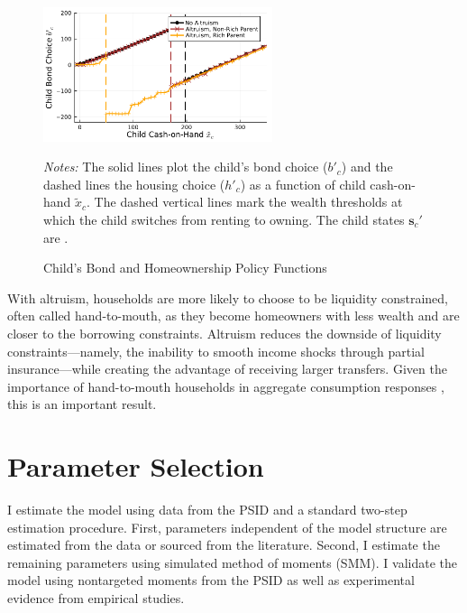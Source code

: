 \documentclass[12pt]{article}
\begin{document}
\begin{figure}
	\begin{center} 
	\caption{Child's Bond and Homeownership Policy Functions}\label{fig:pol}
	\includegraphics[width=0.6\textwidth]{../tabfig/model/pol_bond.pdf}
	\end{center}
	{\vspace{-0.2in}\begin{footnotesize}\textit{Notes:} The solid lines plot the child’s bond choice ($b'_c$) and the dashed lines the housing choice ($h'_c$) as a function of child cash-on-hand $\tilde x_c$. The dashed vertical lines mark the wealth thresholds at which the child switches from renting to owning. The child states $\mathbf{s}_c'$ are \unskip. \end{footnotesize}}
\end{figure}

With altruism, households are more likely to choose to be liquidity constrained, often called hand-to-mouth, as they become homeowners with less wealth and are closer to the borrowing constraints. Altruism reduces the downside of liquidity constraints---namely, the inability to smooth income shocks through partial insurance---while creating the advantage of receiving larger transfers. Given the importance of hand-to-mouth households in aggregate consumption responses \citep[see, e.g.,][]{Kaplan2014a,Boar2020}, this is an important result.

\section{Parameter Selection}\label{sec:estimation}
I estimate the model using data from the PSID and a standard two-step estimation procedure. First, parameters independent of the model structure are estimated from the data or sourced from the literature. Second, I estimate the remaining parameters using simulated method of moments (SMM). I validate the model using nontargeted moments from the PSID as well as experimental evidence from empirical studies. 
\end{document}
